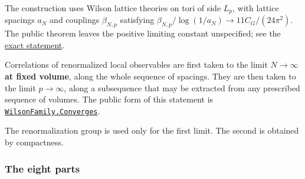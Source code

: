 \documentclass[
  letterpaper,
  11pt]{article}
\begin{document}
The construction uses Wilson lattice theories on tori of side \(L_p\),
with lattice spacings \(a_N\) and couplings \(\beta_{N,p}\) satisfying
\(\beta_{N,p}/\log(1/a_N)\to 11C_G/(24\pi^2)\). The public theorem
leaves the positive limiting constant unspecified; see the
\href{https://github.com/scottnarmstrong/yang-mills-informalization/blob/main/statement.md}{exact
statement}.

Correlations of renormalized local observables are first taken to the
limit \textbf{\(N\to\infty\) at fixed volume}, along the whole sequence
of spacings. They are then taken to the limit \textbf{\(p\to\infty\)},
along a subsequence that may be extracted from any prescribed sequence
of volumes. The public form of this statement is
\href{https://github.com/yang-mills-group/OpenAI-YM-20261028/blob/3456e5e75cf8d4cd558955a5c7638fba2d68f464/PublicWilson.lean\#L85-L90}{\texttt{WilsonFamily.Converges}}.

The renormalization group is used only for the first limit. The second
is obtained by compactness.

\subsubsection{The eight parts}\label{the-eight-parts}
\end{document}
